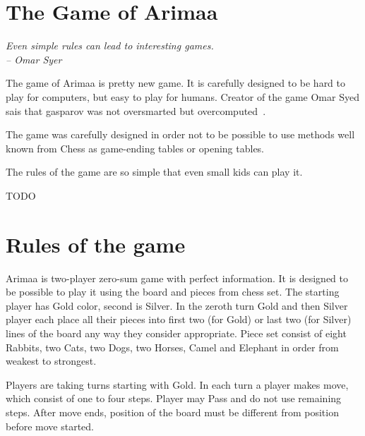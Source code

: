 \section{The Game of Arimaa}
\begin{flushright}
\emph{Even simple rules can lead to interesting games.\\
-- Omar Syer}
\end{flushright}

The game of Arimaa is pretty new game. It is carefully designed to be hard to
play for computers, but easy to play for humans. Creator of the game Omar Syed
sais that gasparov was not oversmarted but overcomputed~\cite{arimaa.com}.


The game was carefully designed in order not to be possible to use methods
well known from Chess as game-ending tables or opening tables. 

The rules of the game are so simple that even small kids can play it.

TODO



\section{Rules of the game~\cite{arimaa.com}}
Arimaa is two-player zero-sum game with perfect information. It is designed to
be possible to play it using the board and pieces from chess set. The starting
player has Gold color, second is Silver. In the zeroth turn Gold and then
Silver player each place all their pieces into first two (for Gold) or last two
(for Silver) lines of the board any way they consider appropriate. Piece set
consist of eight Rabbits, two Cats, two Dogs, two Horses, Camel and Elephant in
order from weakest to strongest.


Players are taking turns starting with Gold. In each turn a player makes move,
which consist of one to four steps. Player may Pass and do not use remaining
steps. After move ends, position of the board must be different from position
before move started.

